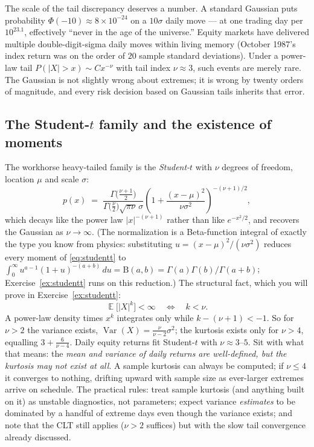 \documentclass[11pt]{article}
\numberwithin{equation}{section}
\theoremstyle{plain}
\theoremstyle{definition}
\theoremstyle{remark}
\DeclareMathOperator{\E}{\mathbb{E}}
\DeclareMathOperator{\Var}{Var}
\begin{document}
The scale of the tail discrepancy deserves a number. A standard Gaussian puts probability $\Phi(-10) \approx 8 \times 10^{-24}$ on a $10\sigma$ daily move --- at one trading day per $10^{23.1}$, effectively ``never in the age of the universe.'' Equity markets have delivered multiple double-digit-sigma daily moves within living memory (October 1987's index return was on the order of $20$ sample standard deviations). Under a power-law tail $P(|X| > x) \sim C x^{-\nu}$ with tail index $\nu \approx 3$, such events are merely rare. The Gaussian is not slightly wrong about extremes; it is wrong by twenty orders of magnitude, and every risk decision based on Gaussian tails inherits that error.

\subsection{The Student-$t$ family and the existence of moments}

The workhorse heavy-tailed family is the \emph{Student-$t$} with $\nu$ degrees of freedom, location $\mu$ and scale $\sigma$:
\begin{equation}
p(x) \;=\; \frac{\Gamma\big(\tfrac{\nu+1}{2}\big)}{\Gamma\big(\tfrac{\nu}{2}\big)\sqrt{\pi \nu}\,\sigma}
\left(1 + \frac{(x-\mu)^2}{\nu \sigma^2}\right)^{-(\nu+1)/2},
\label{eq:studentt}
\end{equation}
which decays like the power law $|x|^{-(\nu+1)}$ rather than like $e^{-x^2/2}$, and recovers the Gaussian as $\nu \to \infty$. (The normalization is a Beta-function integral of exactly the type you know from physics: substituting $u = (x-\mu)^2/(\nu\sigma^2)$ reduces every moment of \eqref{eq:studentt} to $\int_0^\infty u^{a-1}(1+u)^{-(a+b)}\,du = \mathrm{B}(a,b) = \Gamma(a)\Gamma(b)/\Gamma(a+b)$; Exercise~\ref{ex:studentt} runs on this reduction.) The structural fact, which you will prove in Exercise~\ref{ex:studentt}:
\begin{equation}
\E\big[|X|^k\big] < \infty \quad\Longleftrightarrow\quad k < \nu .
\end{equation}
A power-law density times $x^k$ integrates only while $k - (\nu + 1) < -1$. So for $\nu > 2$ the variance exists, $\Var(X) = \tfrac{\nu}{\nu - 2}\sigma^2$; the kurtosis exists only for $\nu > 4$, equalling $3 + \tfrac{6}{\nu - 4}$. Daily equity returns fit Student-$t$ with $\nu \approx 3$--$5$. Sit with what that means: the \emph{mean and variance of daily returns are well-defined, but the kurtosis may not exist at all}. A sample kurtosis can always be computed; if $\nu \le 4$ it converges to nothing, drifting upward with sample size as ever-larger extremes arrive on schedule. The practical rules: treat sample kurtosis (and anything built on it) as unstable diagnostics, not parameters; expect variance \emph{estimates} to be dominated by a handful of extreme days even though the variance exists; and note that the CLT still applies ($\nu > 2$ suffices) but with the slow tail convergence already discussed.
\end{document}
